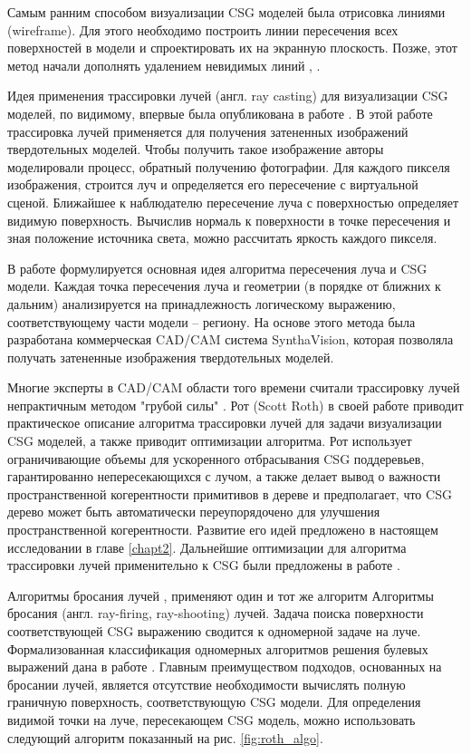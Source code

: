 Самым ранним способом визуализации CSG моделей была отрисовка линиями (wireframe). Для этого необходимо построить линии пересечения всех поверхностей в модели и спроектировать их на экранную плоскость. Позже, этот метод начали дополнять удалением невидимых линий \cite{appel1967notion}, \cite{griffiths1979eliminating}.

Идея применения трассировки лучей (англ. ray casting) для визуализации CSG моделей, по видимому, впервые была опубликована в работе \cite{goldstein1971}. В этой работе трассировка лучей применяется для получения затененных изображений твердотельных моделей. Чтобы получить такое изображение авторы моделировали процесс, обратный получению фотографии. Для каждого пикселя изображения, строится луч и определяется его пересечение с виртуальной сценой. Ближайшее к наблюдателю пересечение луча с поверхностью определяет видимую поверхность. Вычислив нормаль к поверхности в точке пересечения и зная положение источника света, можно рассчитать яркость каждого пикселя. 

В работе формулируется основная идея алгоритма пересечения луча и CSG модели. Каждая точка пересечения луча и геометрии (в порядке от ближних к дальним) анализируется на принадлежность логическому выражению, соответствующему части модели -- региону. На основе этого метода была разработана коммерческая CAD/CAM система SynthaVision, которая позволяла получать затененные изображения твердотельных моделей.

Многие эксперты в CAD/CAM области того времени считали трассировку лучей непрактичным методом "грубой силы" \cite{roth1982ray}. Рот (Scott Roth) в своей работе \cite{roth1982ray} приводит практическое описание алгоритма трассировки лучей для задачи визуализации CSG моделей, а также приводит оптимизации алгоритма. Рот использует ограничивающие объемы для ускоренного отбрасывания CSG поддеревьев, гарантированно непересекающихся с лучом, а также делает вывод о важности пространственной когерентности примитивов в дереве и предполагает, что CSG дерево может быть автоматически переупорядочено для улучшения пространственной когерентности. Развитие его идей предложено в настоящем исследовании в главе \ref{chapt2}. Дальнейшие оптимизации для алгоритма трассировки лучей применительно к CSG были предложены в работе \cite{bronsvoort1984two}.

Алгоритмы бросания лучей \cite{roth1982ray}, \cite{goldstein1971} применяют один и тот же алгоритм 
Алгоритмы бросания (англ. ray-firing, ray-shooting) лучей. Задача поиска поверхности соответствующей CSG выражению сводится к одномерной задаче на луче. Формализованная классификация одномерных алгоритмов решения булевых выражений дана в работе \cite{tilove1980set}. Главным преимуществом подходов, основанных на бросании лучей, является отсутствие необходимости вычислять полную граничную поверхность, соответствующую CSG модели. Для определения видимой точки на луче, пересекающем CSG модель, можно использовать следующий алгоритм показанный на рис. \ref{fig:roth_algo}.

